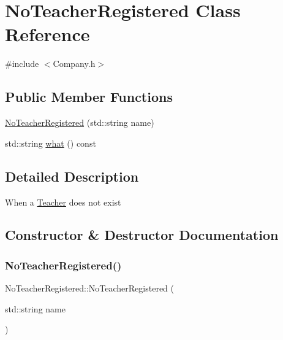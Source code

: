 \hypertarget{class_no_teacher_registered}{}\section{No\+Teacher\+Registered Class Reference}
\label{class_no_teacher_registered}


{\ttfamily \#include $<$Company.\+h$>$}

\subsection*{Public Member Functions}
\begin{DoxyCompactItemize}
\item 
\mbox{\hyperlink{class_no_teacher_registered_a1a79ff4c2def6524d60937297fa27ed3}{No\+Teacher\+Registered}} (std\+::string name)
\item 
std\+::string \mbox{\hyperlink{class_no_teacher_registered_af81eb37b6a596d865c3a63d9900345a1}{what}} () const
\end{DoxyCompactItemize}


\subsection{Detailed Description}
When a \mbox{\hyperlink{class_teacher}{Teacher}} does not exist 

\subsection{Constructor \& Destructor Documentation}
\mbox{\label{class_no_teacher_registered_a1a79ff4c2def6524d60937297fa27ed3}} 
\subsubsection{\texorpdfstring{No\+Teacher\+Registered()}{NoTeacherRegistered()}}
{\footnotesize\ttfamily No\+Teacher\+Registered\+::\+No\+Teacher\+Registered (\begin{DoxyParamCaption}\item[{std\+::string}]{name }\end{DoxyParamCaption})\hspace{0.3cm}{\ttfamily [inline]}}



